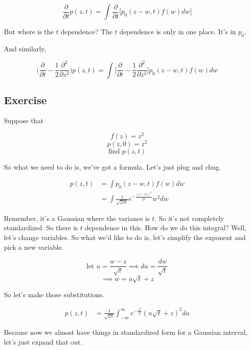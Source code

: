 \documentclass{article}
\begin{document}
$$ \frac{\partial}{\partial t} p(z,t) = \int \frac{\partial}{\partial t} \Big[  p_0(z-w,t)f(w)dw \Big] $$


But where is the $t$ dependence?
The $t$ dependence is only in one place.
It's in $p_0$.

And similarly,


$$ \Big( \frac{\partial}{\partial t} -\frac{1}{2} \frac{\partial^2}{\partial z^2} \Big)p(z,t) = \int  \Big[  \frac{\partial}{\partial t} -\frac{1}{2} \frac{\partial^2}{\partial z^2}  \Big]  p_0(z-w,t)f(w)dw $$


\subsection*{Exercise}


Suppose that 

$$ f(z) = z^2 $$
$$ p(z,0) = z^2 $$
$$ \text{find } p(z,t) $$

So what we need to do is, we've got a formula.
Let's just plug and chug.



\begin{equation*} 
	\begin{split}
		p(z,t) &= \int p_0(z-w,t)f(w)dw  \\
		       &= \int  \frac{1}{\sqrt{2 \pi t}} e^{-\frac{(z-w)^2}{2t}} w^2 dw  
	\end{split}
\end{equation*}


Remember, it's a Gaussian where the variance is $t$.
So it's not completely standardized.
So there is $t$ dependence in this.
How do we do this integral?
Well, let's change variables. So what we'd like to do is, let's simplify the exponent
and pick a new variable.

$$ \text{let } u=\frac{w-z}{\sqrt{t}}  \implies  du=\frac{dw}{\sqrt{t}} $$
$$ \implies  w=u \sqrt{t} + z $$

So let's make those substitutions.



\begin{equation*} 
	\begin{split}
		p(z,t) &=   \frac{1}{\sqrt{2 \pi}} \int_{-\infty}^{\infty}  e^{-\frac{u^2}{2}} (u \sqrt{t} + z)^2 du 
	\end{split}
\end{equation*}


Because now we almost have things in standardized form
for a Gaussian interval, let's just expand that out.
\end{document}
